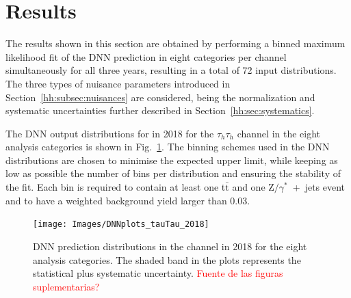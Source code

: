 \documentclass[../main.tex]{subfiles}
\begin{document}




\section{Results}
\label{hh:sec:results}

The results shown in this section are obtained by performing a binned maximum likelihood fit of the DNN prediction in eight categories per channel simultaneously for all three years, resulting in a total of 72 input distributions. The three types of nuisance parameters introduced in Section~\ref{hh:subsec:nuisances} are considered, being the normalization and systematic uncertainties further described in Section~\ref{hh:sec:systematics}. 

The DNN output distributions for in 2018 for the $\tau_h\tau_h$ channel in the eight analysis categories is shown in Fig.~\ref{hh:fig:dnn_tautau}. The binning schemes used in the DNN distributions are chosen to minimise the expected upper limit, while keeping as low as possible the number of bins per distribution and ensuring the stability of the fit. Each bin is required to contain at least one t$\bar{\text{t}}$ and one Z$/\gamma^*$~+~jets event and to have a weighted background yield larger than 0.03.

%


\begin{figure}
\begin{center}
\texttt{[image: Images/DNNplots\_tauTau\_2018]}
\end{center}
\caption{DNN prediction distributions in the \tauh\tauh{} channel in 2018 for the eight analysis categories. The shaded band in the plots represents the statistical plus systematic uncertainty. \textcolor{red}{Fuente de las figuras suplementarias?}}
\label{hh:fig:dnn_tautau}
\end{figure}
\end{document}
